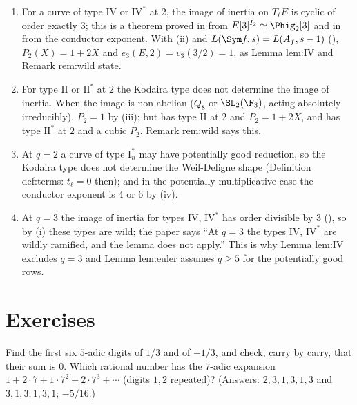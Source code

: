\begin{remark}\label{rem:local:wild-paper}
\begin{enumerate}[label=(\alph*)]
\item For a curve of type $\mathrm{IV}$ or $\mathrm{IV}^*$ at $2$, the image of inertia on $T_\ell E$ is cyclic of order exactly $3$; this is a theorem proved in
 from $E[3]^{I_2}\simeq\Phig_2[3]$ and in  from the conductor exponent. With
(ii) and $L(\Sym f,s)=L(A_f,s-1)$ (), $P_2(X)=1+2X$ and $e_3(E,2)=v_3(3/2)=1$, as Lemma lem:IV and
Remark rem:wild state.
\item For type $\mathrm{II}$ or $\mathrm{II}^*$ at $2$ the Kodaira type does not determine the image of inertia. When the image is non-abelian ($Q_8$ or $\SL_2(\F_3)$,
acting absolutely irreducibly), $P_2=1$ by (iii); but  has type $\mathrm{II}$ at $2$ and $P_2=1+2X$, and  has type
$\mathrm{II}^*$ at $2$ and a cubic $P_2$. Remark rem:wild says this.
\item At $q=2$ a curve of type $\mathrm{I}_n^*$ may have potentially good reduction, so the Kodaira type does not determine the Weil-Deligne shape (Definition
def:terms: $t_\ell=0$ then); and in the potentially multiplicative case the conductor exponent is $4$ or $6$ by (iv).
\item At $q=3$ the image of inertia for types $\mathrm{IV}$, $\mathrm{IV}^*$ has order divisible by $3$ (), so by (i) these types
are wild; the paper says ``At $q=3$ the types $\mathrm{IV}$, $\mathrm{IV}^*$ are wildly ramified, and the lemma does not apply.'' This is why Lemma lem:IV excludes $q=3$ and Lemma lem:euler assumes $q\ge5$ for the potentially good
rows.
\end{enumerate}
\end{remark}

\section{Exercises}\label{sec:local:exercises}

\begin{exercise}\label{ex:local:ex-expansions}
Find the first six $5$-adic digits of $1/3$ and of $-1/3$, and check, carry by carry, that their sum is $0$. Which rational number has the $7$-adic
expansion $1+2\cdot7+1\cdot7^2+2\cdot7^3+\cdots$ (digits $1,2$ repeated)? (Answers: $2,3,1,3,1,3$ and $3,1,3,1,3,1$; $-5/16$.)
\end{exercise}

